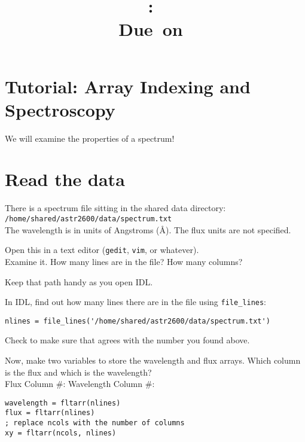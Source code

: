 \documentclass{article}
\title{\vspace{2in}\textmd{\textbf{\hmwkClass:\ \hmwkTitle}}\\\normalsize\vspace{0.1in}\small{Due\ on\ \hmwkDueDate}\\\vspace{0.1in}\large{}\vspace{3in}}
\date{}
\begin{document}
\begin{spacing}{1.0}
\newpage



\section{Tutorial: Array Indexing and Spectroscopy}

We will examine the properties of a spectrum!

\section{Read the data}
There is a spectrum file sitting in the shared data directory:\\
\verb|/home/shared/astr2600/data/spectrum.txt|\\
The wavelength is in units of Angstroms (\AA).  The flux units are
not specified.


Open this in a text editor (\verb|gedit|, \verb|vim|, or whatever).\\
Examine it.  How many lines are in the file?  \underline{\hspace{3cm}}
How many columns? \underline{\hspace{3cm}}

Keep that path handy as you open IDL.

In IDL, find out how many lines there are in the file using \verb|file_lines|:\\
\begin{lstlisting}
nlines = file_lines('/home/shared/astr2600/data/spectrum.txt')
\end{lstlisting}

Check to make sure that agrees with the number you found above.

Now, make two variables to store the wavelength and flux arrays.
Which column is the flux and which is the wavelength? \\
Flux Column \#: \underline{\hspace{3cm}}
Wavelength Column \#: \underline{\hspace{3cm}}
\begin{verbatim}
wavelength = fltarr(nlines)
flux = fltarr(nlines)
; replace ncols with the number of columns
xy = fltarr(ncols, nlines)
\end{verbatim}


\end{spacing}
\end{document}
